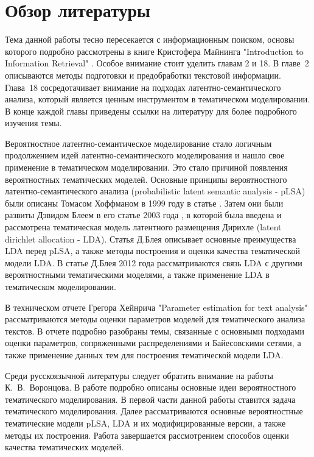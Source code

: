 \documentclass[a4paper]{report}
\begin{document}
	\section{Обзор литературы}
	
	Тема данной работы тесно пересекается с информационным поиском, основы которого подробно рассмотрены в книге Кристофера Майнинга "Introduction to Information Retrieval" \cite{bib:InformationRetrieval}. Особое внимание стоит уделить главам 2 и 18. В главе~2 описываются методы подготовки и предобработки текстовой информации. Глава~18 сосредотачивает внимание на подходах латентно-семантического анализа, который является ценным инструментом в тематическом моделировании. В конце каждой главы приведены ссылки на литературу для более подробного изучения темы. 
	
	Вероятностное латентно-семантическое моделирование стало логичным продолжением идей латентно-семантического моделирования и нашло свое применение в тематическом моделировании. Это стало причиной появления вероятностных тематических моделей. Основные принципы вероятностного латентно-семантического анализа (probabilistic latent semantic analysis - pLSA) были описаны Томасом Хоффманом в 1999 году в статье \cite{bib:Hoffman}. Затем они были развиты Дэвидом Блеем в его статье 2003 года \cite{bib:Blei}, в которой была введена и рассмотрена тематическая модель латентного размещения Дирихле (latent dirichlet allocation - LDA). Статья Д.Блея описывает основные преимущества LDA перед pLSA, а также методы построения и оценки качества тематической модели LDA. В статье Д.Блея 2012 года \cite{bib:Blei2} рассматриваются связь LDA с другими вероятностными тематическими моделями, а также применение LDA в тематическом моделировании.
	
	В техническом отчете Грегора Хейнрича "Parameter estimation for text analysis" \cite{bib:Heinrich}  рассматриваются методы оценки параметров моделей для тематического анализа текстов. В отчете подробно разобраны темы, связанные с основными подходами оценки параметров, сопряженными распределениями и Байесовскими сетями, а также применение данных тем для построения тематической модели LDA. 
	
	 Среди русскоязычной литературы следует обратить внимание на работы К.~В.~Воронцова.  В работе \cite{bib:Voron1} подробно описаны основные идеи вероятностного тематического моделирования. В первой части данной работы ставится задача тематического моделирования. Далее рассматриваются основные вероятностные тематические модели pLSA, LDA и их модифицированные версии, а также методы их построения. Работа завершается рассмотрением способов оценки качества тематических моделей.
	
\end{document}

